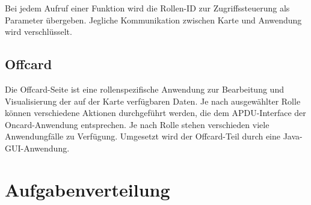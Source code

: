 \documentclass[parskip]{scrartcl}
\begin{document}
	Bei jedem Aufruf einer Funktion wird die Rollen-ID zur Zugriffssteuerung als Parameter übergeben. Jegliche Kommunikation zwischen Karte und Anwendung wird verschlüsselt.

	\subsection{Offcard}
	Die Offcard-Seite ist eine rollenspezifische Anwendung zur Bearbeitung und Visualisierung der auf der Karte verfügbaren Daten. Je nach ausgewählter Rolle können verschiedene Aktionen durchgeführt werden, die dem APDU-Interface der Oncard-Anwendung entsprechen. Je nach Rolle stehen verschieden viele Anwendungfälle zu Verfügung. Umgesetzt wird der Offcard-Teil durch eine Java-GUI-Anwendung. 
	
	
	\section{Aufgabenverteilung}
	
%	
%	
	
\end{document}
